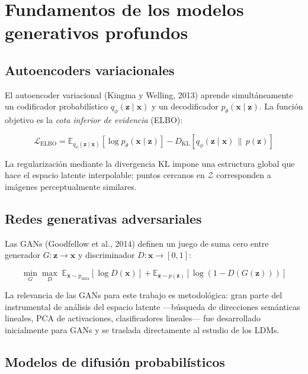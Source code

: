 \documentclass[12pt, a4paper, twoside]{book}
\newcommand{\z}{\mathbf{z}}
\newcommand{\x}{\mathbf{x}}
\newcommand{\E}{\mathbb{E}}
\begin{document}
\section{Fundamentos de los modelos generativos profundos}
\label{sec:fundamentos}

\subsection{Autoencoders variacionales}

El autoencoder variacional (Kingma y Welling, 2013) aprende simultáneamente un codificador probabilístico $q_\phi(\z \mid \x)$ y un decodificador $p_\theta(\x \mid \z)$. La función objetivo es la \textit{cota inferior de evidencia} (ELBO):

\begin{equation}
\mathcal{L}_{\text{ELBO}} = \E_{q_\phi(\z \mid \x)}\!\left[\log p_\theta(\x \mid \z)\right]
  - D_{\mathrm{KL}}\!\left[q_\phi(\z \mid \x) \,\|\, p(\z)\right]
\label{eq:elbo}
\end{equation}

La regularización mediante la divergencia KL impone una estructura global que hace el espacio latente interpolable: puntos cercanos en $\mathcal{Z}$ corresponden a imágenes perceptualmente similares.

\subsection{Redes generativas adversariales}

Las GANs (Goodfellow et al., 2014) definen un juego de suma cero entre generador $G: \z \rightarrow \x$ y discriminador $D: \x \rightarrow [0,1]$:

\begin{equation}
\min_G \max_D \;\E_{\x \sim p_{\text{data}}}\!\left[\log D(\x)\right]
+ \E_{\z \sim p(\z)}\!\left[\log\!\left(1 - D(G(\z))\right)\right]
\end{equation}

La relevancia de las GANs para este trabajo es metodológica: gran parte del instrumental de análisis del espacio latente ---búsqueda de direcciones semánticas lineales, PCA de activaciones, clasificadores lineales--- fue desarrollado inicialmente para GANs y se traslada directamente al estudio de los LDMs.

\subsection{Modelos de difusión probabilísticos}
\end{document}
